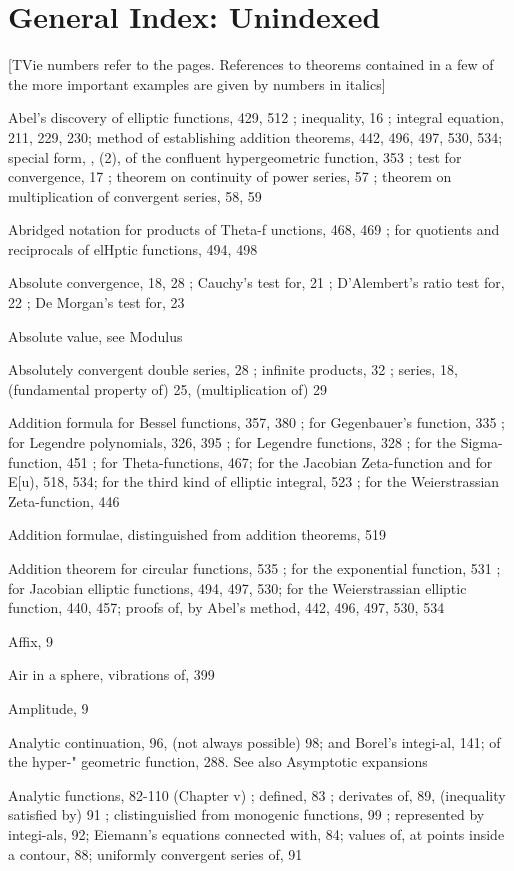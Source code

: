 \chapter{General Index: Unindexed}

[TVie numbers refer to the pages. References to theorems contained in a few of
the more important examples are given by numbers in italics]

Abel's discovery of elliptic functions, 429, 512 ; inequality, 16 ; integral equation, 211, 229, 230;
method of establishing addition theorems, 442, 496, 497, 530, 534; special form,  , (2), of
the confluent hypergeometric function, 353 ; test for convergence, 17 ; theorem on continuity
of power series, 57 ; theorem on multiplication of convergent series, 58, 59

Abridged notation for products of Theta-f unctions, 468, 469 ; for quotients and reciprocals of
elHptic functions, 494, 498

Absolute convergence, 18, 28 ; Cauchy's test for, 21 ; D'Alembert's ratio test for, 22 ; De
 Morgan's test for, 23

Absolute value, see Modulus

Absolutely convergent double series, 28 ; infinite products, 32 ; series, 18, (fundamental
property of) 25, (multiplication of) 29

Addition formula for Bessel functions, 357, 380 ; for Gegenbauer's function, 335 ; for Legendre
polynomials, 326, 395 ; for Legendre functions, 328 ; for the Sigma-function, 451 ; for
Theta-functions, 467; for the Jacobian Zeta-function and for E[u), 518, 534; for the
third kind of elliptic integral, 523 ; for the Weierstrassian Zeta-function, 446

Addition formulae, distinguished from addition theorems, 519

Addition theorem for circular functions, 535 ; for the exponential function, 531 ; for Jacobian
elliptic functions, 494, 497, 530; for the Weierstrassian elliptic function, 440, 457; proofs
of, by Abel's method, 442, 496, 497, 530, 534

Affix, 9

Air in a sphere, vibrations of, 399

Amplitude, 9

Analytic continuation, 96, (not always possible) 98; and Borel's integi-al, 141; of the hyper-"
geometric function, 288. See also Asymptotic expansions

Analytic functions, 82-110 (Chapter v) ; defined, 83 ; derivates of, 89, (inequality satisfied by) 91 ;
clistinguislied from monogenic functions, 99 ; represented by integi-als, 92; Eiemann's
equations connected with, 84; values of, at points inside a contour, 88; uniformly convergent
series of, 91

